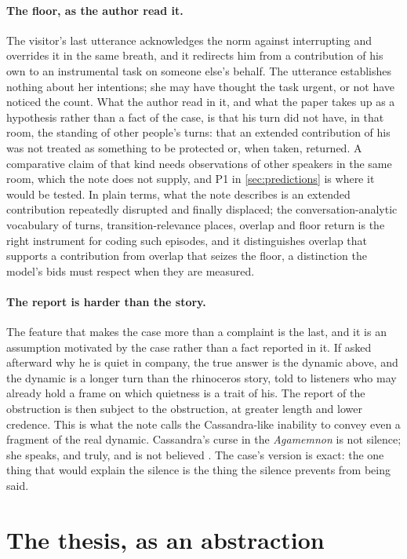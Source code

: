 \paragraph{The floor, as the author read it.} The visitor's last utterance acknowledges the norm against interrupting and overrides it in the same breath, and it redirects him from a contribution of his own to an instrumental task on someone else's behalf. The utterance establishes nothing about her intentions; she may have thought the task urgent, or not have noticed the count. What the author read in it, and what the paper takes up as a hypothesis rather than a fact of the case, is that his turn did not have, in that room, the standing of other people's turns: that an extended contribution of his was not treated as something to be protected or, when taken, returned. A comparative claim of that kind needs observations of other speakers in the same room, which the note does not supply, and P1 in \autoref{sec:predictions} is where it would be tested. In plain terms, what the note describes is an extended contribution repeatedly disrupted and finally displaced; the conversation-analytic vocabulary of turns, transition-relevance places, overlap and floor return \cite{Sacks1974} is the right instrument for coding such episodes, and it distinguishes overlap that supports a contribution from overlap that seizes the floor, a distinction the model's bids must respect when they are measured.

\paragraph{The report is harder than the story.} The feature that makes the case more than a complaint is the last, and it is an assumption motivated by the case rather than a fact reported in it. If asked afterward why he is quiet in company, the true answer is the dynamic above, and the dynamic is a longer turn than the rhinoceros story, told to listeners who may already hold a frame on which quietness is a trait of his. The report of the obstruction is then subject to the obstruction, at greater length and lower credence. This is what the note calls the Cassandra-like inability to convey even a fragment of the real dynamic. Cassandra's curse in the \emph{Agamemnon} is not silence; she speaks, and truly, and is not believed \cite{Aeschylus}. The case's version is exact: the one thing that would explain the silence is the thing the silence prevents from being said.

\section{The thesis, as an abstraction}\label{sec:abstraction}

